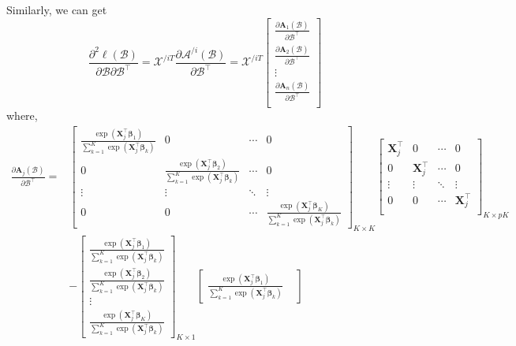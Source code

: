 \documentclass[11pt]{article}
\newcommand{\bX}{\bm{X}}
\newcommand{\bbeta}{\bm{\beta}}
\begin{document}
Similarly, we can get
$$\frac{\partial^2\ell(\bm{\mathcal{B}})}{\partial\bm{\mathcal{B}}\partial\bm{\mathcal{B}}^\top}=\bm{\mathcal{X}}^{/iT}\frac{\partial \bm{\mathcal{A}}^{/i}(\bm{\mathcal{B}})}{\partial\bm{\mathcal{B}}^\top}=
\bm{\mathcal{X}}^{/iT}\begin{bmatrix}
\frac{\partial \bm{A}_1(\bm{\mathcal{B}})}{\partial\bm{\mathcal{B}}^\top} \\
\frac{\partial \bm{A}_2(\bm{\mathcal{B}})}{\partial\bm{\mathcal{B}}^\top} \\
\vdots \\
\frac{\partial \bm{A}_n(\bm{\mathcal{B}})}{\partial\bm{\mathcal{B}}^\top} \\
\end{bmatrix}$$
where,
$$\begin{aligned}\frac{\partial \bm{A}_j(\bm{\mathcal{B}})}{\partial\bm{\mathcal{B}}^\top}=&
\begin{bmatrix}
\frac{\exp\left(\bX_j^\top\bbeta_1\right)}{\sum_{k=1}^K\exp\left(\bX_j^\top\bbeta_k\right)} & 0 & \cdots & 0 \\
0 & \frac{\exp\left(\bX_j^\top\bbeta_2\right)}{\sum_{k=1}^K\exp\left(\bX_j^\top\bbeta_k\right)} & \cdots & 0 \\
\vdots & \vdots & \ddots & \vdots \\
0 & 0 & \cdots &  \frac{\exp\left(\bX_j^\top\bbeta_K\right)}{\sum_{k=1}^K\exp\left(\bX_j^\top\bbeta_k\right)}
\end{bmatrix}_{K\times K}
\begin{bmatrix}
\bX_j^\top & 0 & \cdots & 0 \\
0 & \bX_j^\top & \cdots & 0 \\
\vdots & \vdots & \ddots & \vdots \\
0 & 0 & \cdots & \bX_j^\top \\
\end{bmatrix}_{K\times pK} \\
&-\begin{bmatrix}
\frac{\exp\left(\bX_j^\top\bbeta_1\right)}{\sum_{k=1}^K\exp\left(\bX_j^\top\bbeta_k\right)} \\
\frac{\exp\left(\bX_j^\top\bbeta_2\right)}{\sum_{k=1}^K\exp\left(\bX_j^\top\bbeta_k\right)} \\
\vdots \\
\frac{\exp\left(\bX_j^\top\bbeta_K\right)}{\sum_{k=1}^K\exp\left(\bX_j^\top\bbeta_k\right)}
\end{bmatrix}_{K\times 1}
\begin{bmatrix}
\frac{\exp\left(\bX_j^\top\bbeta_1\right)}{\sum_{k=1}^K\exp\left(\bX_j^\top\bbeta_k\right)} &

\end{bmatrix}
\end{aligned}$$
\end{document}
